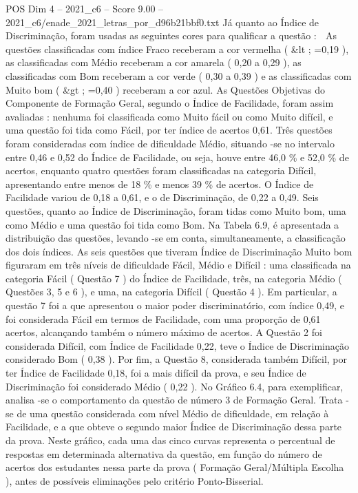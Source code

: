 \begin{textsample}{POS Dim 4 – 2021\_c6 – Score 9.00 – 2021\_c6/enade\_2021\_letras\_por\_d96b21bbf0.txt}
Já quanto ao Índice de Discriminação, foram usadas as seguintes cores para qualificar a questão :  As questões classificadas com índice Fraco receberam a cor vermelha ( \&lt ; =0,19 ), as classificadas com Médio receberam a cor amarela ( 0,20 a 0,29 ), as classificadas com Bom receberam a cor verde ( 0,30 a 0,39 ) e as classificadas com Muito bom ( \&gt ; =0,40 ) receberam a cor azul.
As Questões Objetivas do Componente de Formação Geral, segundo o Índice de Facilidade, foram assim avaliadas : nenhuma foi classificada como Muito fácil ou como Muito difícil, e uma questão foi tida como Fácil, por ter índice de acertos 0,61.
Três questões foram consideradas com índice de dificuldade Médio, situando -se no intervalo entre 0,46 e 0,52 do Índice de Facilidade, ou seja, houve entre 46,0 \% e 52,0 \% de acertos, enquanto quatro questões foram classificadas na categoria Difícil, apresentando entre menos de 18 \% e menos 39 \% de acertos.
O Índice de Facilidade variou de 0,18 a 0,61, e o de Discriminação, de 0,22 a 0,49.
Seis questões, quanto ao Índice de Discriminação, foram tidas como Muito bom, uma como Médio e uma questão foi tida como Bom.
Na Tabela 6.9, é apresentada a distribuição das questões, levando -se em conta, simultaneamente, a classificação dos dois índices.
As seis questões que tiveram Índice de Discriminação Muito bom figuraram em três níveis de dificuldade Fácil, Médio e Difícil : uma classificada na categoria Fácil ( Questão 7 ) do Índice de Facilidade, três, na categoria Médio ( Questões 3, 5 e 6 ), e uma, na categoria Difícil ( Questão 4 ).
Em particular, a questão 7 foi a que apresentou o maior poder discriminatório, com índice 0,49, e foi considerada Fácil em termos de Facilidade, com uma proporção de 0,61 acertos, alcançando também o número máximo de acertos.
A Questão 2 foi considerada Difícil, com Índice de Facilidade 0,22, teve o Índice de Discriminação considerado Bom ( 0,38 ).
Por fim, a Questão 8, considerada também Difícil, por ter Índice de Facilidade 0,18, foi a mais difícil da prova, e seu Índice de Discriminação foi considerado Médio ( 0,22 ).
No Gráfico 6.4, para exemplificar, analisa -se o comportamento da questão de número 3 de Formação Geral.
Trata -se de uma questão considerada com nível Médio de dificuldade, em relação à Facilidade, e a que obteve o segundo maior Índice de Discriminação dessa parte da prova.
Neste gráfico, cada uma das cinco curvas representa o percentual de respostas em determinada alternativa da questão, em função do número de acertos dos estudantes nessa parte da prova ( Formação Geral/Múltipla Escolha ), antes de possíveis eliminações pelo critério Ponto-Bisserial.

\end{textsample}
